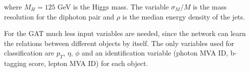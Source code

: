 
where $M_H = 125$ GeV is the Higgs mass. The variable $\sigma_M/M$ is the mass resolution for the diphoton pair and $\rho$ is the median energy density of the jets.

For the GAT much less input variables are needed, since the network can learn the relations between different objects by itself. The only variables used for classification are
$p_T$, $\eta$, $\phi$ and an identification variable (photon MVA ID, b-tagging score, lepton MVA ID) for each object.






